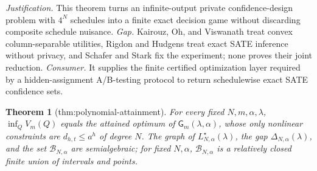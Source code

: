 \documentclass{article}
\newtheorem{theorem}{Theorem}
\begin{document}
\par\smallskip\noindent \textit{Justification.} This theorem turns an infinite-output private confidence-design problem with \(4^N\) schedules into a finite exact decision game without discarding composite schedule nuisance. \textit{Gap.} Kairouz, Oh, and Viswanath treat convex column-separable utilities, Rigdon and Hudgens treat exact SATE inference without privacy, and Schafer and Stark fix the experiment; none proves their joint reduction. \textit{Consumer.} It supplies the finite certified optimization layer required by a hidden-assignment A/B-testing protocol to return schedulewise exact SATE confidence sets.

\begin{theorem}[thm:polynomial-attainment]\label{thm:polynomial-attainment}
For every fixed \(N,m,\alpha,\lambda\), \(\inf_QV_m(Q)\) equals the attained optimum of \(\mathsf G_m(\lambda,\alpha)\), whose only nonlinear constraints are \(d_{h,t}\le a^h\) of degree \(N\). The graph of \(L^\star_{N,\alpha}(\lambda)\), the gap \(\Delta_{N,\alpha}(\lambda)\), and the set \(\mathcal B_{N,\alpha}\) are semialgebraic; for fixed \(N,\alpha\), \(\mathcal B_{N,\alpha}\) is a relatively closed finite union of intervals and points.
\end{theorem}
\end{document}

